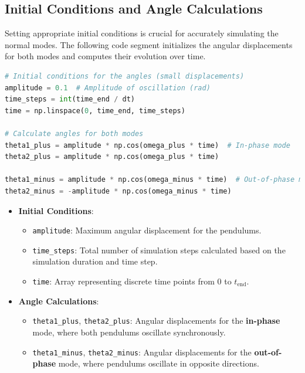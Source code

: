 \documentclass[12pt]{report} %
\begin{document}
\subsection{Initial Conditions and Angle Calculations}
\label{subsec:part1_task3_initial_conditions}

Setting appropriate initial conditions is crucial for accurately simulating the normal modes. The following code segment initializes the angular displacements for both modes and computes their evolution over time.

\begin{lstlisting}[language=Python, caption={Initializing Angles for Normal Modes}, label={lst:initial_conditions_angles}]
# Initial conditions for the angles (small displacements)
amplitude = 0.1  # Amplitude of oscillation (rad)
time_steps = int(time_end / dt)
time = np.linspace(0, time_end, time_steps)

# Calculate angles for both modes
theta1_plus = amplitude * np.cos(omega_plus * time)  # In-phase mode
theta2_plus = amplitude * np.cos(omega_plus * time)

theta1_minus = amplitude * np.cos(omega_minus * time)  # Out-of-phase mode
theta2_minus = -amplitude * np.cos(omega_minus * time)
\end{lstlisting}

\begin{itemize}
    \item \textbf{Initial Conditions}:
    \begin{itemize}
        \item \texttt{amplitude}: Maximum angular displacement for the pendulums.
        \item \texttt{time\_steps}: Total number of simulation steps calculated based on the simulation duration and time step.
        \item \texttt{time}: Array representing discrete time points from \( 0 \) to \( t_{\text{end}} \).
    \end{itemize}
    
    \item \textbf{Angle Calculations}:
    \begin{itemize}
        \item \texttt{theta1\_plus}, \texttt{theta2\_plus}: Angular displacements for the \textbf{in-phase} mode, where both pendulums oscillate synchronously.
        \item \texttt{theta1\_minus}, \texttt{theta2\_minus}: Angular displacements for the \textbf{out-of-phase} mode, where pendulums oscillate in opposite directions.
    \end{itemize}
\end{itemize}
\end{document}
